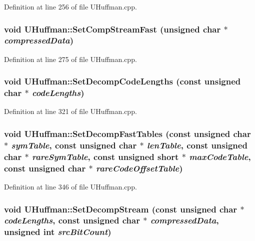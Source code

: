 Definition at line 256 of file UHuffman.cpp.\hypertarget{class_u_huffman_9787e1690a35cb0338b9225a2699b01e}{
\subsubsection[{SetCompStreamFast}]{\setlength{\rightskip}{0pt plus 5cm}void UHuffman::SetCompStreamFast (unsigned char $\ast$ {\em compressedData})}}
\label{class_u_huffman_9787e1690a35cb0338b9225a2699b01e}




Definition at line 275 of file UHuffman.cpp.\hypertarget{class_u_huffman_96d45824c8002b45be38b9cf6ce36e02}{
\subsubsection[{SetDecompCodeLengths}]{\setlength{\rightskip}{0pt plus 5cm}void UHuffman::SetDecompCodeLengths (const unsigned char $\ast$ {\em codeLengths})}}
\label{class_u_huffman_96d45824c8002b45be38b9cf6ce36e02}




Definition at line 321 of file UHuffman.cpp.\hypertarget{class_u_huffman_3b8362f5138b30083836f777baa7e792}{
\subsubsection[{SetDecompFastTables}]{\setlength{\rightskip}{0pt plus 5cm}void UHuffman::SetDecompFastTables (const unsigned char $\ast$ {\em symTable}, \/  const unsigned char $\ast$ {\em lenTable}, \/  const unsigned char $\ast$ {\em rareSymTable}, \/  const unsigned short $\ast$ {\em maxCodeTable}, \/  const unsigned char $\ast$ {\em rareCodeOffsetTable})}}
\label{class_u_huffman_3b8362f5138b30083836f777baa7e792}




Definition at line 346 of file UHuffman.cpp.\hypertarget{class_u_huffman_4724b209df72141b8f40cdff1ce67c0e}{
\subsubsection[{SetDecompStream}]{\setlength{\rightskip}{0pt plus 5cm}void UHuffman::SetDecompStream (const unsigned char $\ast$ {\em codeLengths}, \/  const unsigned char $\ast$ {\em compressedData}, \/  unsigned int {\em srcBitCount})}}
\label{class_u_huffman_4724b209df72141b8f40cdff1ce67c0e}




